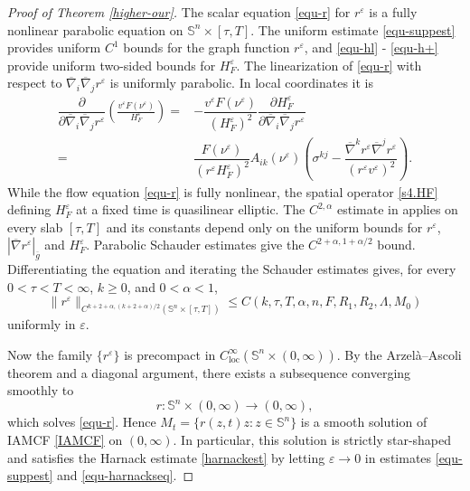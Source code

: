 \documentclass[11pt,reqno]{amsart}
\theoremstyle{definition}
\theoremstyle{remark}
\numberwithin{equation}{section}
\begin{document}
\begin{proof}[Proof of Theorem \ref{higher-our}]
The scalar equation \eqref{equ-r} for $r^{\varepsilon}$ is a fully nonlinear parabolic equation on $\mathbb{S}^n\times[\tau,T]$. The uniform estimate \eqref{equ-suppest} provides uniform $C^{1}$ bounds for the graph function $r^{\varepsilon}$, and \eqref{equ-hl} - \eqref{equ-h+} provide uniform two-sided bounds for $H_F^{\varepsilon}$. The linearization of \eqref{equ-r} with respect to $\overline\nabla_i\overline\nabla_j r^\varepsilon$ is uniformly parabolic. In local coordinates it is
\begin{align*}
			\dfrac{\partial}{\partial \overline{\nabla}_i\overline{\nabla}_j r^{\varepsilon}}\left(\frac{v^{\varepsilon}F(\nu^{\varepsilon})}{H_F^{\varepsilon}}\right) =& -\dfrac{v^{\varepsilon}F(\nu^{\varepsilon})}{\left(H_F^{\varepsilon}\right)^2}\dfrac{\partial H_F^{\varepsilon}}{\partial \overline{\nabla}_i\overline{\nabla}_j r^{\varepsilon}} \\
			=& \dfrac{F(\nu^{\varepsilon})}{\left(r^{\varepsilon}H_F^{\varepsilon}\right)^2}A_{ik}(\nu^{\varepsilon})\left(\sigma^{kj}-\dfrac{\overline{\nabla}^k r^{\varepsilon}\overline{\nabla}^j r^{\varepsilon}}{(r^{\varepsilon}v^{\varepsilon})^2} \right).
		\end{align*}
While the flow equation \eqref{equ-r} is fully nonlinear, the spatial operator \eqref{s4.HF} defining $H_F^{\varepsilon}$ at a fixed time is quasilinear elliptic. The $C^{2,\alpha}$ estimate in \cite[Pages 119--122]{Xia17} applies on every slab $[\tau,T]$ and its constants depend only on the uniform bounds for $r^{\varepsilon}$, $|\overline{\nabla}r^{\varepsilon}|_{\overline{g}}$ and $H_F^{\varepsilon}$. Parabolic Schauder estimates give the $C^{2+\alpha,1+\alpha/2}$ bound. Differentiating the equation and iterating the Schauder estimates gives, for every $0<\tau<T<\infty$, $k\geq 0$, and $0<\alpha<1$,
\begin{equation}
	\label{equ-high}
	\|r^{\varepsilon}\|_{C^{k+2+\alpha,(k+2+\alpha)/2}(\mathbb{S}^n \times[\tau,T])}\leq C(k,\tau,T,\alpha,n,F,R_1,R_2,\Lambda,M_0)
\end{equation}
uniformly in $\varepsilon$.
        
		
		Now the family $\{r^{\varepsilon}\}$ is precompact in $C^\infty_{\mathrm{loc}}(\mathbb S^n\times(0,\infty))$. By the Arzel\`a--Ascoli theorem and a diagonal argument, there exists a subsequence converging smoothly to
		\begin{equation*}
			r:\mathbb S^n\times(0,\infty)\to(0,\infty),
		\end{equation*}
		which solves \eqref{equ-r}. Hence $M_t=\{r(z,t)z:z\in\mathbb S^n\}$ is a smooth solution of IAMCF \eqref{IAMCF} on $(0,\infty)$. In particular, this solution is strictly star-shaped and satisfies the Harnack estimate \eqref{harnackest} by letting $\varepsilon \to 0$ in estimates \eqref{equ-suppest} and \eqref{equ-harnackseq}.
		

\end{proof}
\end{document}
